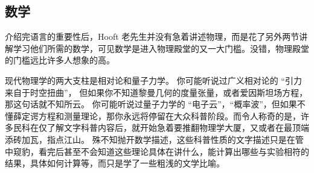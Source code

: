 \subsection{数学}
介绍完语言的重要性后，Hooft 老先生并没有急着讲述物理，而是花了另外两节讲解学习他们所需的数学，可见数学是进入物理殿堂的又一大门槛。没错，物理殿堂的门槛远比许多人想象的高。

现代物理学的两大支柱是相对论和量子力学。 你可能听说过广义相对论的 “引力来自于时空扭曲”， 但如果你不知道黎曼几何的度量张量，或者爱因斯坦场方程，那这句话就不知所云。 你可能听说过量子力学的 “电子云”，“概率波”，但如果不懂薛定谔方程和测量理论，那你永远将停留在大众科普阶段。而令人称奇的是，许多民科在仅了解文字科普内容后，就开始急着要推翻物理学大厦，又或者在最顶端添砖加瓦，指点江山。 殊不知抛开数学描述，这些科普性质的文字描述只是在管中窥豹，看完后甚至不会知道这些理论具体在讲什么，能计算出哪些与实验相符的结果，具体如何计算等，而只是学了一些粗浅的文学比喻。

